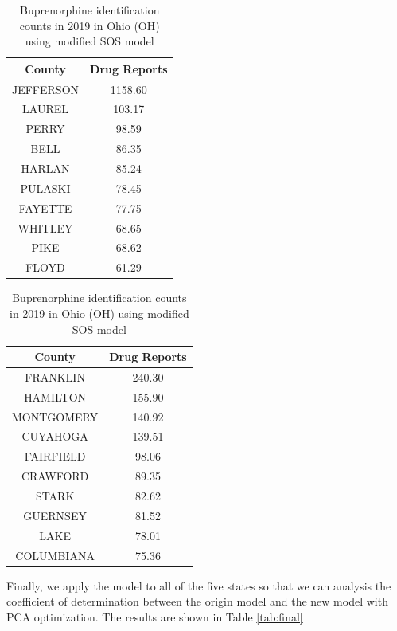 \documentclass{mcmthesis}
\begin{document}
\begin{table}[H]
    \caption{ Results Table for Optimizied SOS Model}
     \begin{subtable}[t]{0.45\linewidth}
     \centering
    \caption{Hydrocodone identification counts in 2008 in  Kentucky (KY) using modified SOS model}
    \label{tab:2008new}
    \begin{tabular}{|c|c|}
        \hline
County& Drug Reports  \\\hline
JEFFERSON&1158.60\\
LAUREL&103.17\\
PERRY&98.59\\
BELL&86.35\\
HARLAN&85.24\\
PULASKI&78.45\\
FAYETTE&77.75\\
WHITLEY&68.65\\
PIKE&68.62\\
FLOYD&61.29\\
\hline
    \end{tabular}
\end{subtable}\hfill
 \begin{subtable}[t]{0.45\linewidth}
    \centering
    \caption{Buprenorphine identification counts in 2019 in Ohio (OH) using modified SOS model}
    \label{tab:2019new}
    \begin{tabular}{|c|c|}\hline
      County& Drug Reports  \\\hline  
FRANKLIN&240.30\\
HAMILTON&155.90\\
MONTGOMERY&140.92\\
CUYAHOGA&139.51\\
FAIRFIELD&98.06\\
CRAWFORD&89.35\\
STARK&82.62\\
GUERNSEY&81.52\\
LAKE&78.01\\
COLUMBIANA&75.36\\
\hline
    \end{tabular}
\end{subtable}
\end{table} 

Finally, we apply the model to all of the five states so that we can analysis the coefficient of determination between the origin model and the new model with PCA optimization. The results are shown in Table \ref{tab:final}
\end{document}
